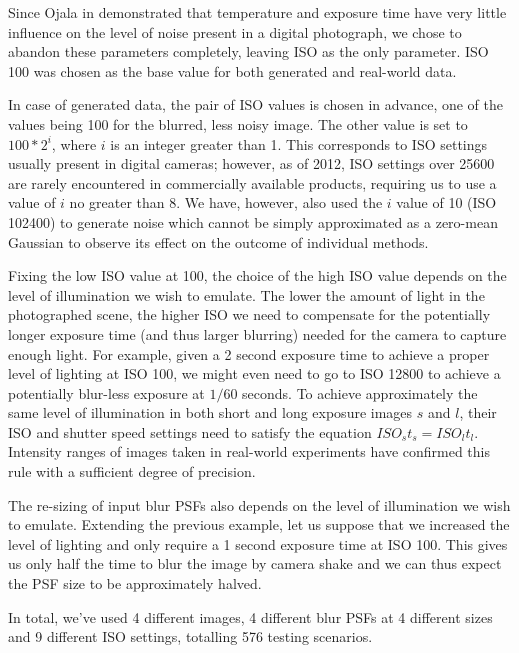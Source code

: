 \documentclass[12pt,notitlepage]{report}
\begin{document}
Since Ojala in \cite{ojal08} demonstrated that temperature and exposure time have very little influence on the level of noise present in a digital photograph, we chose to abandon these parameters completely, leaving ISO as the only parameter. ISO 100 was chosen as the base value for both generated and real-world data. 

In case of generated data, the pair of ISO values is chosen in advance, one of the values being 100 for the blurred, less noisy image. The other value is set to $100*2^i$, where $i$ is an integer greater than 1. This corresponds to ISO settings usually present in digital cameras; however, as of 2012, ISO settings over 25600 are rarely encountered in commercially available products, requiring us to use a value of $i$ no greater than 8. We have, however, also used the $i$ value of 10 (ISO 102400) to generate noise which cannot be simply approximated as a zero-mean Gaussian to observe its effect on the outcome of individual methods.  

Fixing the low ISO value at 100, the choice of the high ISO value depends on the level of illumination we wish to emulate. The lower the amount of light in the photographed scene, the higher ISO we need to compensate for the potentially longer exposure time (and thus larger blurring) needed for the camera to capture enough light. For example, given a 2 second exposure time to achieve a proper level of lighting at ISO 100, we might even need to go to ISO 12800 to achieve a potentially blur-less exposure at $1/60$ seconds. To achieve approximately the same level of illumination in both short and long exposure images $s$ and $l$, their ISO and shutter speed settings need to satisfy the equation $ISO_s t_s = ISO_l t_l$. Intensity ranges of images taken in real-world experiments have confirmed this rule with a sufficient degree of precision.  

The re-sizing of input blur PSFs also depends on the level of illumination we wish to emulate. Extending the previous example, let us suppose that we increased the level of lighting and only require a 1 second exposure time at ISO 100. This gives us only half the time to blur the image by camera shake and we can thus expect the PSF size to be approximately halved.   

In total, we've used 4 different images, 4 different blur PSFs at 4 different sizes and 9 different ISO settings, totalling 576 testing scenarios. 
\end{document}
